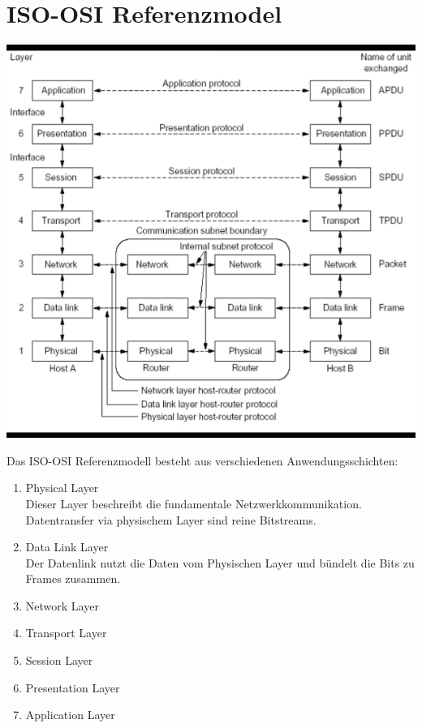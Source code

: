 \documentclass[11pt]{article}
\begin{document}
\section{ISO-OSI Referenzmodel}

    \includegraphics[width=\textwidth]{ISO_OSIReferenceModel.png}

    Das ISO-OSI Referenzmodell besteht aus verschiedenen Anwendungsschichten:
    \begin{enumerate}
        \item Physical Layer\\
        Dieser Layer beschreibt die fundamentale Netzwerkkommunikation. Datentransfer via
        physischem Layer sind reine Bitstreams.
        \item Data Link Layer\\
        Der Datenlink nutzt die Daten vom Physischen Layer und bündelt die Bits zu Frames zusammen.

        \item Network Layer
        \item Transport Layer
        \item Session Layer
        \item Presentation Layer
        \item Application Layer
    \end{enumerate}
\end{document}
